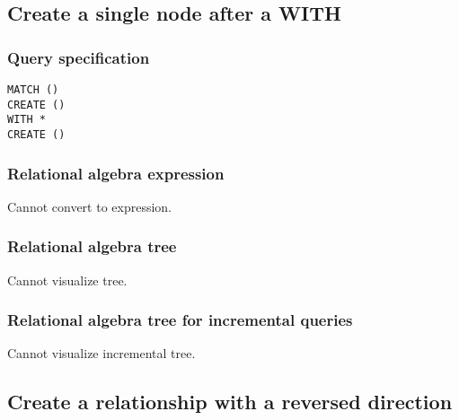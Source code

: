 
\subsection{Create a single node after a WITH}

\subsubsection*{Query specification}

\begin{lstlisting}
MATCH ()
CREATE ()
WITH *
CREATE ()
\end{lstlisting}

\subsubsection*{Relational algebra expression}

Cannot convert to expression.

\subsubsection*{Relational algebra tree}

Cannot visualize tree.

\subsubsection*{Relational algebra tree for incremental queries}

Cannot visualize incremental tree.

\subsection{Create a relationship with a reversed direction}

